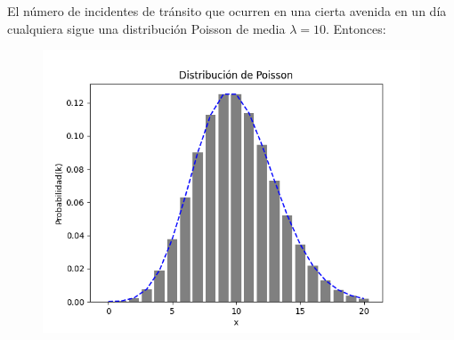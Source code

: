 El número de incidentes de tránsito que ocurren en una cierta avenida en un día
cualquiera sigue una distribución Poisson de media $\lambda=10$. Entonces:

\begin{figure}
    \centering
  \includegraphics[scale=0.6]{../slides/figures/poisson_distribution_lambda_10.png}
\end{figure}

